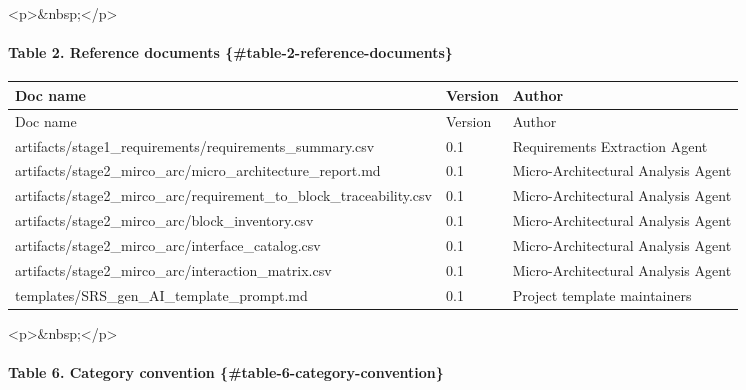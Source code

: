 \documentclass[11pt]{article}
\begin{document}
<p>\&nbsp;</p>

\paragraph{Table 2. Reference documents \{\#table-2-reference-documents\}}


\begin{longtable}{|p{}|p{}|p{}|}
\hline
Doc name & Version & Author \\
\hline
\endfirsthead
\hline
Doc name & Version & Author \\
\hline
\endhead
artifacts/stage1\_requirements/requirements\_summary.csv & 0.1 & Requirements Extraction Agent \\
\hline
artifacts/stage2\_mirco\_arc/micro\_architecture\_report.md & 0.1 & Micro-Architectural Analysis Agent \\
\hline
artifacts/stage2\_mirco\_arc/requirement\_to\_block\_traceability.csv & 0.1 & Micro-Architectural Analysis Agent \\
\hline
artifacts/stage2\_mirco\_arc/block\_inventory.csv & 0.1 & Micro-Architectural Analysis Agent \\
\hline
artifacts/stage2\_mirco\_arc/interface\_catalog.csv & 0.1 & Micro-Architectural Analysis Agent \\
\hline
artifacts/stage2\_mirco\_arc/interaction\_matrix.csv & 0.1 & Micro-Architectural Analysis Agent \\
\hline
templates/SRS\_gen\_AI\_template\_prompt.md & 0.1 & Project template maintainers \\
\hline
\end{longtable}


<p>\&nbsp;</p>

\paragraph{Table 6. Category convention \{\#table-6-category-convention\}}
\end{document}
